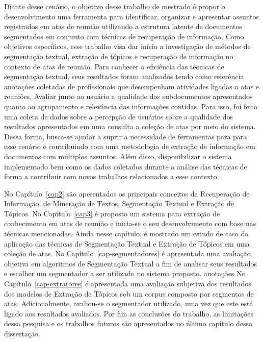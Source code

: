 
Diante desse cenário, o objetivo desse trabalho de mestrado é propor o desenvolvimento uma ferramenta para identificar, organizar e apresentar assuntos registrados em atas de reunião utilizando a estrutura latente de documentos segmentados em conjunto com técnicas de recuperação de informação. 
%
Como objetivos específicos, esse trabalho visa  
dar início a investigação de métodos de segmentação textual, extração de tópicos e recuperação de informação no contexto de atas de reunião. Para conhecer a eficiência das técnicas de segmentação textual, seus resultados foram analisados tendo como referência anotações coletadas de profissionais que desempenham atividades ligadas a atas e reuniões.
Avaliar junto ao usuário a qualidade dos subdocumentos apresentados quanto ao agrupamento e relevância das informações contidas. Para isso, foi feito uma coleta de dados sobre a percepção de usuários sobre a qualidade dos resultados apresentados em uma consulta a coleção de atas por meio do sistema.
% 
Dessa forma, busca-se ajudar a suprir a necessidade de ferramentas para para esse cenário e contribuindo com uma metodologia de extração de informação em documentos com múltiplos assuntos. Além disso, disponibilizar o sistema implementado bem como os dados coletados durante a análise das técnicas de forma a contribuir com novos trabalhos relacionados a esse contexto.





No Capítulo~\ref{cap2} são apesentados os principais conceitos da Recuperação de Informação, de Mineração de Textos, Segmentação Textual e Extração de Tópicos.
%
No Capítulo~\ref{cap3} é proposto um sistema para extração de conhecimento em atas de reunião e inicia-se o seu desenvolvimento com base nas técnicas mencionadas. 
Ainda nesse capítulo, é mostrado um estudo de caso da aplicação das técnicas de Segmentação Textual e Extração de Tópicos em uma coleção de atas. 
%
No Capítulo~\ref{cap-segmentadores} é apresentada uma avaliação objetiva em algoritmos de Segmentação Textual a fim de analisar seus resultados e escolher um segmentador a ser utilizado no sistema proposto.
anotações
%
No Capítulo~\ref{cap-extratores} é apresentada uma avaliação subjetiva dos resultados dos modelos de Extração de Tópicos sob um corpus composto por segmentos de atas. Adicionalmente, avaliou-se o segmentador utilizado, uma vez que este está ligado aos resultados avaliados. 
%
Por fim as conclusões do trabalho, as limitações dessa pesquisa e os trabalhos futuros são apresentados no último capítulo dessa dissertação.

















